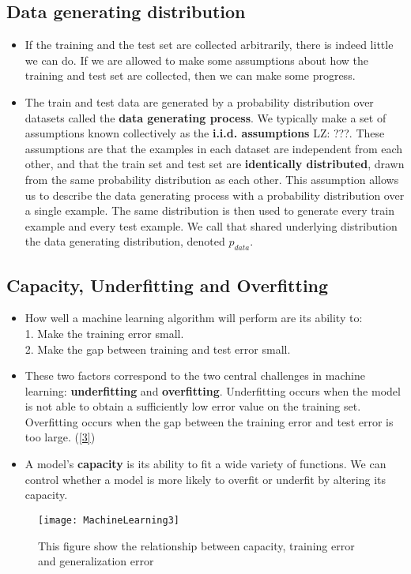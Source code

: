 \subsection{Data generating distribution}
\begin{itemize}
    \item If the training and the test set are collected arbitrarily, there is indeed little we can
    do. If we are allowed to make some assumptions about how the training and test set are collected, then we can make some progress.
    \item The train and test data are generated by a probability distribution over datasets called the \textbf{data generating process}. We typically make a set of assumptions known collectively as the \textbf{i.i.d. assumptions}{\color{red} LZ: ???}. These assumptions are that the examples in each dataset are	independent from each other, and that the train set and test set are \textbf{identically distributed}, drawn from the same probability distribution as each other. This assumption allows us to describe the data generating process with a probability distribution over a single example. The same distribution is then used to generate every train example and every test example.
    We call that shared underlying distribution the
    data generating distribution, denoted $p_{data}$. 
\end{itemize}
\subsection{Capacity, Underfitting and Overfitting}
\begin{itemize}
    \item How well a machine learning algorithm will perform are its ability to:\\ 1. Make the training error small.\\ 2. Make the gap between training and test error small.
    
    \item These two factors correspond to the two central challenges in machine learning: \textbf{underfitting} and \textbf{overfitting}. Underfitting occurs when the model is not able to obtain a sufficiently low error value on the training set. Overfitting occurs when the gap between the training error and test error is too large. (\eqref{3})
    \item  A model's \textbf {capacity} is its ability to fit a wide variety of functions. We can control whether a model is more likely to overfit or underfit by altering its capacity.
\end{itemize}
\begin{figure}
    \caption{This figure show the relationship between capacity, training error and generalization error}
    \texttt{[image: MachineLearning3]}\label{3}
\end{figure}
